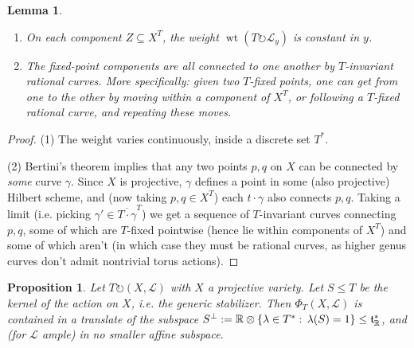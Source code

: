 \documentclass[10pt,a4paper]{amsart}
\newtheorem{lemma}[Thm]{Lemma}
\newtheorem{proposition}[Thm]{Proposition}
\DeclareMathOperator{\wt}{wt}
\newcommand{\RR}{\mathbb{R}}
\newcommand\lie[1]{{\mathfrak #1}}
\newcommand\tensor\otimes
\newcommand\calL{{\mathcal L}}
\newcommand\actson\circlearrowright
\renewcommand{\colon}{\mathrel{:}}
\renewcommand{\colon}{:\mkern\thinmuskip}
\begin{document}
\begin{lemma}\label{lem:fixedPoints}
  \begin{enumerate}
  \item On each component $Z \subseteq X^T$, the weight
    $\wt(T\actson \calL_y)$ is constant in $y$.
  \item The fixed-point components are all connected to one another
    by $T$-invariant rational curves. More specifically: given two $T$-fixed
    points, one can get from one to the other by moving within a component
    of $X^T$, or following a $T$-fixed rational curve, and repeating
    these moves.
  \end{enumerate}
\end{lemma}

\begin{proof}
  (1) The weight varies continuously, inside a discrete set $T^*$.

  (2) Bertini's theorem implies that any two points $p,q$ on $X$ can
  be connected by {\em some} curve $\gamma$. Since $X$ is projective,
  $\gamma$ defines a point in some (also projective)
  Hilbert scheme, and (now taking $p,q\in X^T$) each $t\cdot \gamma$ also
  connects $p,q$. Taking a limit (i.e. picking
  $\gamma' \in \overline{T\cdot\gamma}^T$)
  we get a sequence of $T$-invariant curves connecting $p,q$, some of which are
  $T$-fixed pointwise (hence lie within components of $X^T$) and some of
  which aren't (in which case they must be rational curves, as higher genus
  curves don't admit nontrivial torus actions). 
\end{proof}

\begin{proposition}\label{prop:spanOfPhi}
  Let $T \actson (X,\calL)$ with $X$ a projective variety.
  Let $S \leq T$ be the kernel of the action on $X$, i.e. the generic
  stabilizer. Then $\Phi_T(X,\calL)$ is contained in a translate of
  the subspace $S^\perp := \RR \tensor \{\lambda \in T^*\colon \lambda(S)=1\}
  \leq \lie t^*_\RR$, and (for $\calL$ ample) in no smaller affine subspace.
\end{proposition}
\end{document}
